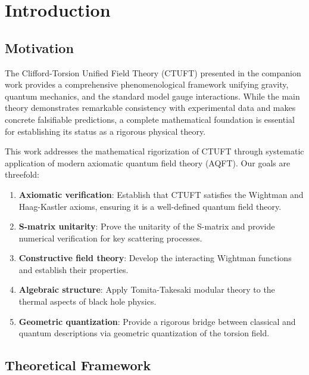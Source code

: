 \section{Introduction}
\label{sec:intro}

\subsection{Motivation}

The Clifford-Torsion Unified Field Theory (CTUFT) presented in the companion work \cite{wang2026ctuft} provides a comprehensive phenomenological framework unifying gravity, quantum mechanics, and the standard model gauge interactions. While the main theory demonstrates remarkable consistency with experimental data and makes concrete falsifiable predictions, a complete mathematical foundation is essential for establishing its status as a rigorous physical theory.

This work addresses the mathematical rigorization of CTUFT through systematic application of modern axiomatic quantum field theory (AQFT). Our goals are threefold:

\begin{enumerate}
    \item \textbf{Axiomatic verification}: Establish that CTUFT satisfies the Wightman and Haag-Kastler axioms, ensuring it is a well-defined quantum field theory.
    
    \item \textbf{S-matrix unitarity}: Prove the unitarity of the S-matrix and provide numerical verification for key scattering processes.
    
    \item \textbf{Constructive field theory}: Develop the interacting Wightman functions and establish their properties.
    
    \item \textbf{Algebraic structure}: Apply Tomita-Takesaki modular theory to the thermal aspects of black hole physics.
    
    \item \textbf{Geometric quantization}: Provide a rigorous bridge between classical and quantum descriptions via geometric quantization of the torsion field.
\end{enumerate}

\subsection{Theoretical Framework}

